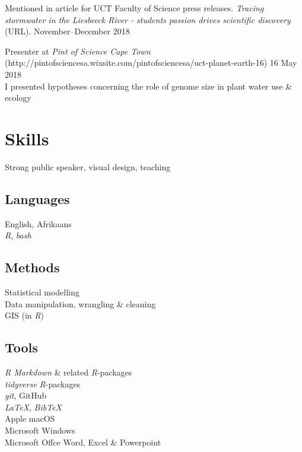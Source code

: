 \documentclass[10pt]{article}
\begin{document}
Mentioned in article for UCT Faculty of Science press releases. \textit{Tracing 
stormwater in the Liesbeeck River - students passion drives scientific 
discovery} (URL).                                 \hfill November--December 2018

Presenter at \textit{Pint of Science Cape Town}
(http://pintofsciencesa.wixsite.com/pintofsciencesa/uct-planet-earth-16)
                                                           \hfill 16 May 2018 \\
I presented hypotheses concerning the role of genome size in plant water use 
\& ecology

\vfill

\hrulefill

\clearpage

\section*{Skills} %

\begin{multicols}{2}

Strong public speaker, visual design, teaching

\subsection*{Languages}

English, Afrikaans \\
\textit{R}, \textit{bash}

\subsection*{Methods}

Statistical modelling \\
Data manipulation, wrangling \& cleaning \\
GIS (in \textit{R})

\columnbreak

\subsection*{Tools}

\textit{R Markdown} \& related \textit{R}-packages \\
\textit{tidyverse} \textit{R}-packages \\
\textit{git}, GitHub \\
\textit{LaTeX}, \textit{BibTeX} \\
Apple macOS \\
Microsoft Windows \\
Microsoft Offce Word, Excel \& Powerpoint

\end{multicols}
\end{document}
